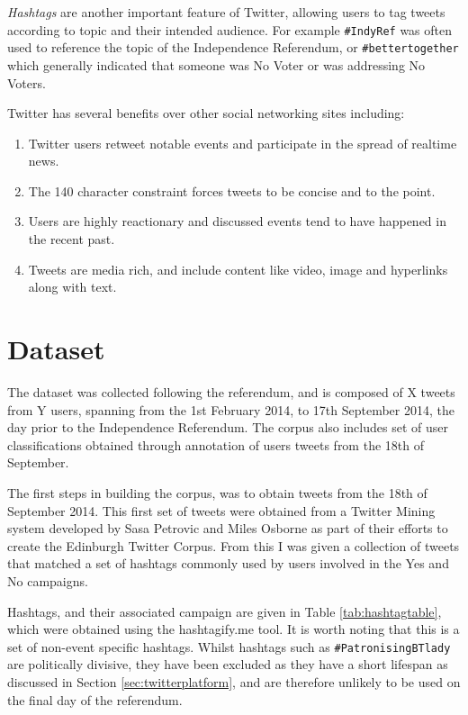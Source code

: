 \documentclass[bsc,frontabs,singlespacing,parskip]{infthesis}     %
\begin{document}
\textit{Hashtags} are another important feature of Twitter, allowing users to tag tweets according to topic and their intended audience. For example \texttt{\#IndyRef} was often used to reference the topic of the Independence Referendum, or \texttt{\#bettertogether} which generally indicated that someone was No Voter or was addressing No Voters.

Twitter has several benefits over other social networking sites \cite{benefitsoftwitter}\cite{quantpol} including:
\begin{enumerate}
\item{Twitter users retweet notable events and participate in the spread of realtime news.}
\item{The 140 character constraint forces tweets to be concise and to the point.}
\item{Users are highly reactionary and discussed events tend to have happened in the recent past.}
\item{Tweets are media rich, and include content like video, image and hyperlinks along with text.} 
\end{enumerate}

\section{Dataset}

The dataset was collected following the referendum, and is composed of X tweets from Y users, spanning from the 1st February 2014, to 17th September 2014,  the day prior to the Independence Referendum. The corpus also includes set of user classifications obtained through annotation of  users tweets from the 18th of September.

The first steps in building the corpus, was to obtain tweets from the 18th of September 2014. This first set of tweets were obtained from a Twitter Mining system developed by Sasa Petrovic and Miles Osborne as part of their efforts to create the Edinburgh Twitter Corpus. From this I  was given a collection of tweets that matched a set of hashtags commonly used by users involved in the Yes and No campaigns. 

Hashtags, and their associated campaign are given in Table \ref{tab:hashtagtable}, which were obtained using the hashtagify.me tool. It is worth noting that this is a set of non-event specific hashtags. Whilst hashtags such as \texttt{\#PatronisingBTlady}\cite{patronisingbtlady} are politically divisive, they have been excluded as they have a short lifespan as discussed in Section \ref{sec:twitterplatform}, and are therefore unlikely to be used on the final day of the referendum. 
\end{document}
